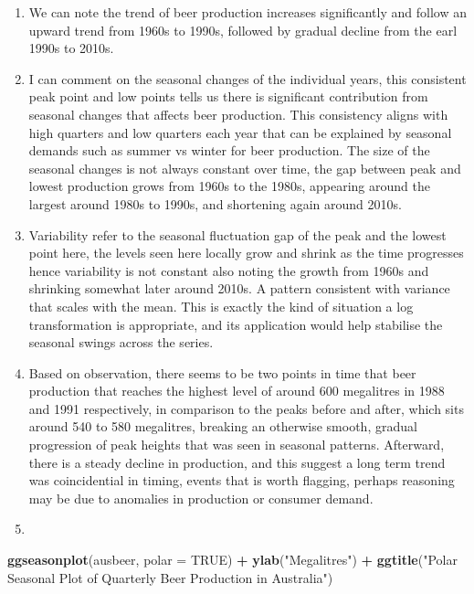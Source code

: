 \documentclass[
]{article}
\newenvironment{Shaded}{\begin{snugshade}}{\end{snugshade}}
\newcommand{\AttributeTok}[1]{\textcolor[rgb]{0.13,0.29,0.53}{#1}}
\newcommand{\ConstantTok}[1]{\textcolor[rgb]{0.56,0.35,0.01}{#1}}
\newcommand{\FunctionTok}[1]{\textcolor[rgb]{0.13,0.29,0.53}{\textbf{#1}}}
\newcommand{\NormalTok}[1]{#1}
\newcommand{\SpecialCharTok}[1]{\textcolor[rgb]{0.81,0.36,0.00}{\textbf{#1}}}
\newcommand{\StringTok}[1]{\textcolor[rgb]{0.31,0.60,0.02}{#1}}
\begin{document}
\begin{enumerate}
\def\labelenumi{\arabic{enumi}.}
\setcounter{enumi}{1}
\item
  We can note the trend of beer production increases significantly and
  follow an upward trend from 1960s to 1990s, followed by gradual
  decline from the earl 1990s to 2010s.
\item
  I can comment on the seasonal changes of the individual years, this
  consistent peak point and low points tells us there is significant
  contribution from seasonal changes that affects beer production. This
  consistency aligns with high quarters and low quarters each year that
  can be explained by seasonal demands such as summer vs winter for beer
  production. The size of the seasonal changes is not always constant
  over time, the gap between peak and lowest production grows from 1960s
  to the 1980s, appearing around the largest around 1980s to 1990s, and
  shortening again around 2010s.
\item
  Variability refer to the seasonal fluctuation gap of the peak and the
  lowest point here, the levels seen here locally grow and shrink as the
  time progresses hence variability is not constant also noting the
  growth from 1960s and shrinking somewhat later around 2010s. A pattern
  consistent with variance that scales with the mean. This is exactly
  the kind of situation a log transformation is appropriate, and its
  application would help stabilise the seasonal swings across the
  series.
\item
  Based on observation, there seems to be two points in time that beer
  production that reaches the highest level of around 600 megalitres in
  1988 and 1991 respectively, in comparison to the peaks before and
  after, which sits around 540 to 580 megalitres, breaking an otherwise
  smooth, gradual progression of peak heights that was seen in seasonal
  patterns. Afterward, there is a steady decline in production, and this
  suggest a long term trend was coincidential in timing, events that is
  worth flagging, perhaps reasoning may be due to anomalies in
  production or consumer demand.
\item
\end{enumerate}

\begin{Shaded}
\begin{Highlighting}[]
\FunctionTok{ggseasonplot}\NormalTok{(ausbeer, }\AttributeTok{polar =} \ConstantTok{TRUE}\NormalTok{) }\SpecialCharTok{+}
  \FunctionTok{ylab}\NormalTok{(}\StringTok{"Megalitres"}\NormalTok{) }\SpecialCharTok{+}
  \FunctionTok{ggtitle}\NormalTok{(}\StringTok{"Polar Seasonal Plot of Quarterly Beer Production in Australia"}\NormalTok{)}
\end{Highlighting}
\end{Shaded}
\end{document}
